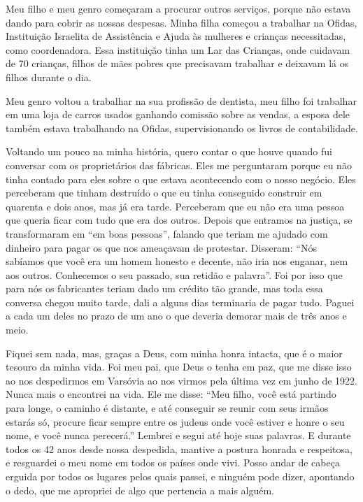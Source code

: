 Meu filho e meu genro começaram a procurar outros serviços, porque não
estava dando para cobrir as nossas despesas. Minha filha começou a
trabalhar na Ofidas, Instituição Israelita de Assistência e Ajuda às
mulheres e crianças necessitadas, como coordenadora. Essa instituição
tinha um Lar das Crianças, onde cuidavam de 70 crianças, filhos de mães
pobres que precisavam trabalhar e deixavam lá os filhos durante o dia.

Meu genro voltou a trabalhar na sua profissão de dentista, meu filho foi
trabalhar em uma loja de carros usados ganhando comissão sobre as
vendas, a esposa dele também estava trabalhando na Ofidas,
supervisionando os livros de contabilidade.

Voltando um pouco na minha história, quero contar o que houve quando fui
conversar com os proprietários das fábricas. Eles me perguntaram porque
eu não tinha contado para eles sobre o que estava acontecendo com o
nosso negócio. Eles perceberam que tinham destruído o que eu tinha
conseguido construir em quarenta e dois anos, mas já era tarde.
Perceberam que eu não era uma pessoa que queria ficar com tudo que era
dos outros. Depois que entramos na justiça, se transformaram em ``em
boas pessoas'', falando que teriam me ajudado com dinheiro para pagar os
que nos ameaçavam de protestar. Disseram: ``Nós sabíamos que você era um
homem honesto e decente, não iria nos enganar, nem aos outros.
Conhecemos o seu passado, sua retidão e palavra''. Foi por isso que para
nós os fabricantes teriam dado um crédito tão grande, mas toda essa
conversa chegou muito tarde, dali a alguns dias terminaria de pagar
tudo. Paguei a cada um deles no prazo de um ano o que deveria demorar
mais de três anos e meio.

Fiquei sem nada, mas, graças a Deus, com minha honra intacta, que é
o maior tesouro da minha vida. Foi meu pai, que Deus o tenha em
paz, que me disse isso ao nos despedirmos em Varsóvia ao nos virmos pela última
vez em junho de 1922. Nunca mais o encontrei na vida. Ele me disse:
``Meu filho, você está partindo para longe, o caminho é distante, e até
conseguir se reunir com seus irmãos estarás só, procure ficar sempre
entre os judeus onde você estiver e honre o seu nome, e você nunca
perecerá.'' Lembrei e segui até hoje suas palavras. E durante todos os 42 anos desde nossa despedida, mantive a
postura honrada e respeitosa, e resguardei o meu nome em todos os países
onde vivi. Posso andar de cabeça erguida por todos os lugares pelos quais 
passei, e ninguém pode dizer, apontando o dedo, que me apropriei de
algo que pertencia a mais alguém.
